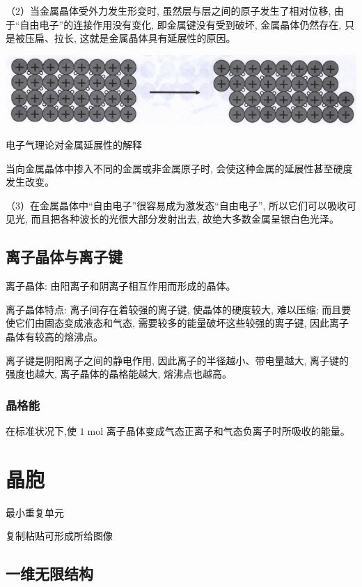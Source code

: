 \documentclass[10pt,cn]{elegantbook}
\begin{document}
（2）当金属晶体受外力发生形变时, 虽然层与层之间的原子发生了相对位移, 由于“自由电子”的连接作用没有变化, 即金属键没有受到破坏, 金属晶体仍然存在, 只是被压扁、拉长, 这就是金属晶体具有延展性的原因。

\begin{center}
	\includegraphics[max width=1.0\textwidth]{image/c116-2.jpg}
\end{center}

电子气理论对金属延展性的解释

当向金属晶体中掺入不同的金属或非金属原子时, 会使这种金属的延展性甚至硬度发生改变。

（3）在金属晶体中“自由电子”很容易成为激发态“自由电子”, 所以它们可以吸收可见光, 而且把各种波长的光很大部分发射出去, 故绝大多数金属呈银白色光泽。

\section{离子晶体与离子键}

离子晶体: 由阳离子和阴离子相互作用而形成的晶体。

离子晶体特点: 离子间存在着较强的离子键, 使晶体的硬度较大, 难以压缩; 而且要使它们由固态变成液态和气态, 需要较多的能量破坏这些较强的离子键, 因此离子晶体有较高的熔沸点。

离子键是阴阳离子之间的静电作用, 因此离子的半径越小、带电量越大, 离子键的强度也越大, 离子晶体的晶格能越大, 熔沸点也越高。

\subsection{晶格能}

 在标准状况下,使 \(1\mathrm{\;{mol}}\) 离子晶体变成气态正离子和气态负离子时所吸收的能量。
 
 \chapter{晶胞}
 
 最小重复单元
 
 复制粘贴可形成所给图像

 \section{一维无限结构}
 
\end{document}
